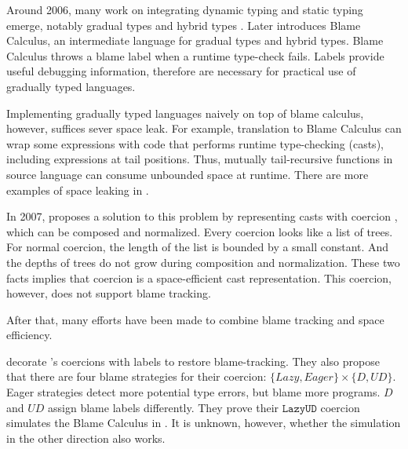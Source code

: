 \documentclass[acmsmall,review,anonymous]{acmart}\settopmatter{printfolios=true,printccs=false,printacmref=false}
\newcommand{\lazyUD}{$\mathtt{Lazy UD}$}
\begin{document}

Around 2006, many work on integrating dynamic typing and static typing emerge, 
notably gradual types \cite{siek2006gradual} and hybrid types 
\cite{flanagan2006hybrid}. 
Later \citet{wadler2009well} introduces Blame Calculus, an intermediate 
language for gradual types and hybrid types. 
Blame Calculus throws a blame label when a runtime type-check fails.
Labels provide useful debugging information, therefore are necessary for 
practical use of gradually typed languages.

Implementing gradually typed languages naively on top of blame calculus, 
however, suffices sever space leak.
For example, translation to Blame Calculus can wrap some expressions with code 
that performs runtime type-checking (casts), including expressions at 
tail positions. Thus, mutually tail-recursive functions in source language can 
consume unbounded space at runtime. There are more examples of space leaking in 
\citet{herman2010space}.

In 2007, \citet{herman2010space} proposes a solution to this problem by 
representing casts with coercion \cite{henglein1994dynamic}, 
which can be composed and normalized. Every coercion looks like a list of 
trees. For normal coercion, the length of the list is bounded by a small 
constant. And the depths of trees do not grow during composition and
normalization. These two facts implies that coercion is a space-efficient cast 
representation. This coercion, however, does not support blame 
tracking. 

After that, many efforts have been made to combine blame tracking and 
space efficiency. 


\citet{siek2009exploring} decorate \citet{herman2010space}'s coercions with 
labels to restore 
blame-tracking. They also propose that there are four blame 
strategies for their coercion:
$ \{Lazy, Eager\} \times \{D, UD\} $. 
Eager strategies detect more potential type errors, 
but blame more programs.
$ D $ and $ UD $ assign blame labels differently.
They prove their \lazyUD{} coercion simulates the Blame Calculus in 
\cite{wadler2009well}. It is unknown, however, whether the simulation in the 
other direction also works.
\end{document}
